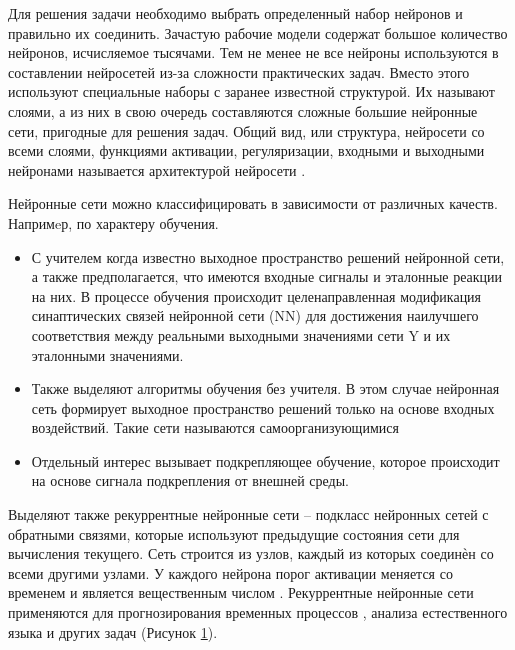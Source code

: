 Для решения задачи необходимо выбрать определенный набор
нейронов и правильно их соединить. Зачастую рабочие модели содержат большое количество нейронов, исчисляемое тысячами.
Тем не менее не все нейроны используются в составлении нейросетей из-за сложности практических задач. Вместо этого используют специальные
наборы с заранее известной структурой. Их называют слоями, а из них в
свою очередь составляются сложные большие нейронные сети, пригодные
для решения задач. Общий вид, или структура, нейросети со всеми слоями,
функциями активации, регуляризации, входными и выходными нейронами
называется архитектурой нейросети \cite{cyber_alex}.

Нейронные сети можно классифицировать в зависимости от различных качеств. Напримeр, по характеру обучения.
\begin{itemize}
	\item С учителем когда известно выходное пространство решений нейронной сети, а также предполагается, что имеются входные сигналы и
эталонные реакции на них. В процессе обучения происходит целенаправленная модификация синаптических связей нейронной сети (NN)
для достижения наилучшего соответствия между реальными выходными значениями сети Y и их эталонными значениями.
	\item Также выделяют алгоритмы обучения без учителя. В этом случае нейронная сеть формирует выходное
	пространство решений только на основе входных воздействий. Такие
	сети называются самоорганизующимися
	\item Отдельный интерес вызывает подкрепляющее обучение, которое происходит на основе сигнала подкрепления от внешней среды.
\end{itemize}

Выделяют также рекуррентные нейронные сети -- подкласс нейронных сетей с обратными связями, которые
используют предыдущие состояния сети для вычисления текущего. Сеть строится из узлов, каждый
из которых соединѐн со всеми другими узлами. У каждого нейрона порог активации меняется со
временем и является вещественным числом \cite{bguir_rnn}. 
Рекуррентные нейронные сети применяются для прогнозирования временных процессов \cite{bgu_krasn}, анализа естественного языка и других задач (Рисунок \ref{fig:rec}).
\begin{figure}[H]
	\caption{}
	\label{fig:rec}
\end{figure}

